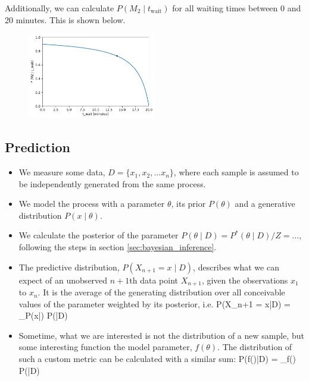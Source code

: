 Additionally, we can calculate $P(M_2\;|\;t_\text{wait})$ for all waiting times between 0 and 20 minutes. This is shown below.
\begin{figure}[h]
	\centering
	\includegraphics[width=0.5\textwidth]{figs/Baggage_wait.pdf}
\end{figure}


\subsection{Prediction}
\begin{itemize}
	\item We measure some data, $D = \{x_1, x_2, \ldots x_n\}$, where each sample is assumed to be independently generated from the same process.
	\item We model the process with a parameter $\theta$, its prior $P(\theta)$ and a generative distribution $P(x\;|\;\theta)$.
	\item We calculate the posterior of the parameter $P(\theta\;|\;D) = P^\ast(\theta\;|\;D) / Z = \ldots$, following the steps in section \ref{sec:bayesian_inference}.
	\item The predictive distribution, $P(X_{n+1} = x\;|\;D)$, describes what we can expect of an unobserved $n+1$th data point $X_{n+1}$, given the observations $x_1$ to $x_n$. It is the average of the generating distribution over all conceivable values of the parameter weighted by its posterior, i.e. 
	\be
		P(X_{n+1} = x\;|\;D) = \sum_\theta P(x\;|\theta)\; P(\theta\;|\;D)
	\ee
	\item Sometime, what we are interested is not the distribution of a new sample, but some interesting function the model parameter, $f(\theta)$. The distribution of such a custom metric can be calculated with a similar sum:  
	\be
		P(f(\theta)\;|\;D) = \sum_\theta f(\theta)\; P(\theta\;|\;D)
	\ee
\end{itemize}
